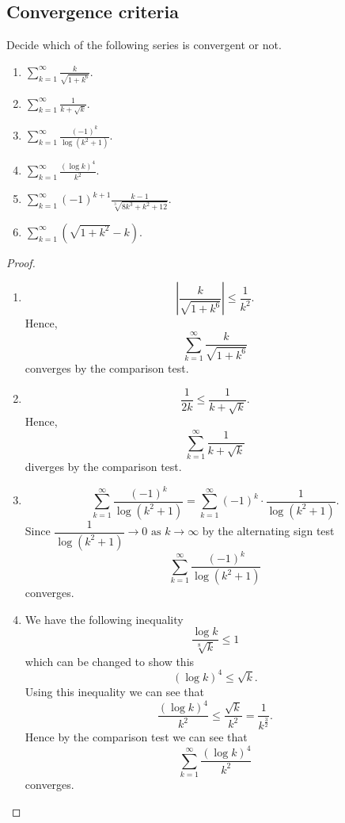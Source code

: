 \documentclass[10pt, a4paper]{article}
\newcommand{\limas}[3][n]{#2 \rightarrow #3 \text{ as } #1 \rightarrow \infty}
\renewcommand{\infsum}[1][n = 1]{\sum_{#1}^{\infty}}
\begin{document}
\subsection{Convergence criteria}

\begin{example}
    Decide which of the following series is convergent or not.
    \begin{enumerate}[label = \alph*.]
        \item $\displaystyle \sum_{k = 1}^{\infty}\frac{k}{\sqrt{1 + k ^ 6}}.$
        \item $\displaystyle \sum_{k = 1}^{\infty}\frac{1}{k + \sqrt{k}}.$
        \item $\displaystyle \sum_{k = 1}^{\infty}\frac{(-1) ^ k}{\log{(k ^ 2 + 1)}}.$
        \item $\displaystyle \sum_{k = 1}^{\infty}\frac{(\log k) ^ 4}{k ^ 2}.$
        \item $\displaystyle \sum_{k = 1}^{\infty}(-1)^{k + 1}\frac{k - 1}{\sqrt[3]{8k ^ 3 + k ^ 2 + 12}}.$
        \item $\displaystyle \sum_{k = 1}^{\infty}\left(\sqrt{1 + k ^ 2} - k\right).$
    \end{enumerate}
    \begin{proof}
    \begin{enumerate}[label = \alph*.]
        \item \phantom{}
        \[
        \left|\frac{k}{\sqrt{1 + k ^ 6}}\right| \leq \frac{1}{k ^ 2}. 
        \]
        Hence,
        \[
        \infsum[k = 1]\frac{k}{\sqrt{1 + k ^ 6}}
        \]
        converges by the comparison test.

        \item
        \[
        \frac{1}{2k} \leq \frac{1}{k + \sqrt{k}}. 
        \]
        Hence,
        \[
        \infsum[k = 1]\frac{1}{k + \sqrt{k}}
        \]
        diverges by the comparison test.

        \item
        \[
        \infsum[k = 1]\frac{(-1) ^ k}{\log{(k ^ 2 + 1)}} = \infsum[k = 1](-1) ^ k \cdot \frac{1}{\log{(k ^ 2 + 1)}}.
        \]
        Since $\limas[k]{\dfrac{1}{\log(k ^ 2 + 1)}}{0}$ by the alternating sign test
        \[
        \infsum[k = 1]\frac{(-1) ^ k}{\log{(k ^ 2 + 1)}}
        \]
        converges.

        \item
        We have the following inequality
        \[
        \frac{\log k}{\sqrt[8]{k}} \leq 1
        \]
        which can be changed to show this
        \[
        (\log k) ^ 4 \leq \sqrt{k}.
        \]
        Using this inequality we can see that
        \[
        \frac{(\log k) ^ 4}{k ^ 2} \leq \frac{\sqrt{k}}{k ^ 2} = \frac{1}{k ^ {\frac{3}{2}}}.
        \]
        Hence by the comparison test we can see that
        \[
        \infsum[k = 1]\frac{(\log k) ^ 4}{k ^ 2}
        \]
        converges.
        
        
    \end{enumerate}
    \end{proof}
\end{example}
\end{document}
